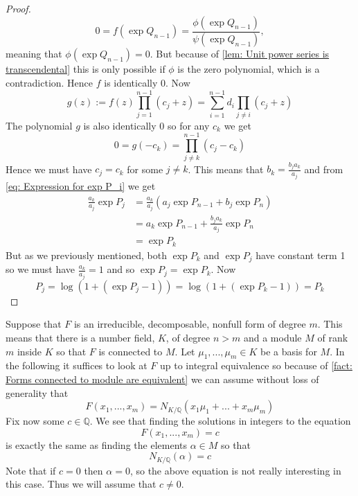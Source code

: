 \documentclass{article}
\newcommand{\mbb}[1]{\mathbb{#1}}
\numberwithin{equation}{section}
\begin{document}
\begin{proof}
    $$0 = f(\exp Q_{n-1}) = \frac{\phi(\exp Q_{n-1})}{\psi(\exp Q_{n-1})},$$
    meaning that $\phi(\exp Q_{n-1}) = 0$. But because of \cref{lem: Unit power series is transcendental} this is only possible if $\phi$ is the zero polynomial, which is a contradiction. Hence $f$ is identically 0. Now
    $$g(z) := f(z) \prod_{j=1}^{n-1}(c_j + z)  = \sum_{i = 1}^{n-1}d_i\prod_{j \neq i}(c_j + z)$$
    The polynomial $g$ is also identically 0 so for any $c_k$ we get $$0 = g(-c_k) = \prod_{j \neq k}^{n-1} (c_j - c_k)$$
    Hence we must have $c_j = c_k$ for some $j \neq k$. This means that $b_k = \frac{b_j a_k}{a_j}$ and from \cref{eq: Expression for exp P_i} we get
    \begin{align*}
        \frac{a_k}{a_j}\exp P_j & = \frac{a_k}{a_j}(a_j \exp P_{n-1} + b_j \exp P_n) \\
                                & = a_k \exp P_{n-1} + \frac{b_j a_k}{a_j} \exp P_n  \\
                                & = \exp P_k
    \end{align*}
    But as we previously mentioned, both $\exp P_k$ and $\exp P_j$ have constant term 1 so we must have $\frac{a_k}{a_j} = 1$ and so $\exp P_j = \exp P_k$. Now
    $$P_j = \log(1 + (\exp P_j - 1)) = \log(1 + (\exp P_k - 1)) = P_k$$
\end{proof}

Suppose that $F$ is an irreducible, decomposable, nonfull form of degree $m$. This means that there is a number field, $K$, of degree $n > m$ and a module $M$ of rank $m$ inside $K$ so that $F$ is connected to $M$. Let $\mu_1, ..., \mu_m \in K$ be a basis for $M$. In the following it suffices to look at $F$ up to integral equivalence so because of \cref{fact: Forms connected to module are equivalent} we can assume without loss of generality that
\begin{equation*}
    F(x_1, ..., x_m) = N_{K / \mbb Q}(x_1 \mu_1 + ... + x_m \mu_m)
\end{equation*}
Fix now some $c \in \mbb Q$. We see that finding the solutions in integers to the equation
\begin{equation}\label{eq: Initial equation of interest}
    F(x_1, ..., x_m) = c
\end{equation}
is exactly the same as finding the elements $\alpha \in M$ so that
\begin{equation}
    N_{K / \mbb Q}(\alpha) = c
\end{equation}
Note that if $c = 0$ then $\alpha = 0$, so the above equation is not really interesting in this case. Thus we will assume that $c \neq 0$.
\end{document}
